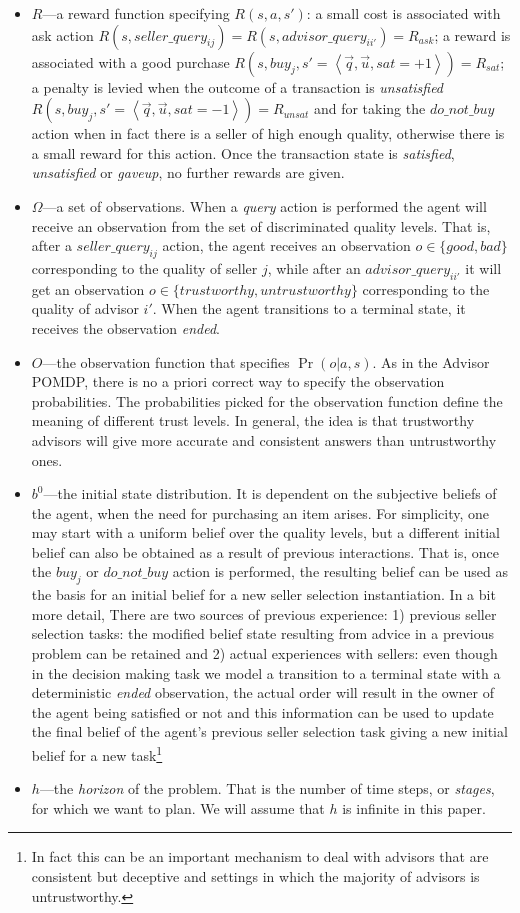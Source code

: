 \documentclass{aamas2014}
\begin{document}
\begin{itemize}
\item $R$---a reward function specifying $R(s,a,s')$: a small cost is associated with ask action $R(s,seller\_query_{ij})=R(s,advisor\_query_{ii'})=R_{ask}$; a reward is associated with a good purchase $R(s,buy_j,s'=\left\langle \vec{q},\vec{u},sat=+1\right\rangle )=R_{sat}$; a penalty is levied when the outcome of a transaction is \emph{unsatisfied} $R(s,buy_j,s'=\left\langle\vec{q},\vec{u},sat=-1\right\rangle )=R_{unsat}$ and for taking the $do\_not\_buy$ action when in fact there is a seller of high enough quality, otherwise there is a small reward for this action. Once the transaction state is \textit{satisfied}, \textit{unsatisfied} or \textit{gaveup}, no further rewards are given.
\item $\Omega$---a set of observations. When a \emph{query} action is performed the agent will receive an observation from the set of discriminated quality levels. That is, after a $seller\_query_{ij}$ action, the agent receives an observation $o\in \{good, bad\}$ corresponding to the quality of seller $j$, while after an $advisor\_query_{ii'}$ it will get an observation $o\in \{trustworthy, untrustworthy\}$ corresponding to the quality of advisor $i'$. When the agent transitions to a terminal state, it receives the observation \textit{ended}.
\item $O$---the observation function that specifies $\Pr(o|a,s)$. As in the Advisor POMDP, there is no a priori correct way to specify the observation probabilities. The probabilities picked for the observation function define the meaning of different trust levels. In general, the idea is that trustworthy advisors will give more accurate and consistent answers than untrustworthy ones.
\item $b^{0}$---the initial state distribution. It is dependent on the subjective beliefs of the agent, when the need for purchasing an item arises. For simplicity, one may start with a uniform belief over the quality levels, but a different initial belief can also be obtained as a result of previous interactions. That is, once the $buy_j$ or $do\_not\_buy$ action is performed, the resulting belief can be used as the basis for an initial belief for a new seller selection instantiation. In a bit more detail, There are two sources of previous experience: 1) previous seller selection tasks: the modified belief state resulting from advice in a previous problem can be retained and 2) actual experiences with sellers: even though in the decision making task we model a transition to a terminal state with a deterministic \emph{ended} observation, the actual order will result in the owner of the agent being satisfied or not and this information can be used to update the final belief of the agent's previous seller selection task giving a new initial belief for a new task\footnote{In fact this can be an important mechanism to deal with advisors that are consistent but deceptive and settings in which the majority of advisors is untrustworthy.}
\item $h$---the \emph{horizon} of the problem. That is the number of time steps, or \emph{stages}, for which we want to plan. We will assume that $h$ is infinite in this paper.
\end{itemize}
\end{document}
